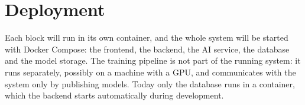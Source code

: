\section{Deployment}
\label{sec:deployment}

Each block will run in its own container, and the whole system will be started with Docker
Compose: the frontend, the backend, the AI service, the database and the model storage. The
training pipeline is not part of the running system: it runs separately, possibly on a machine
with a GPU, and communicates with the system only by publishing models. Today only the database
runs in a container, which the backend starts automatically during development.
